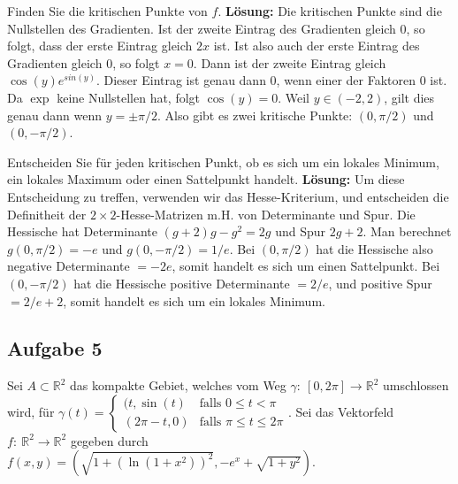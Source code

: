 \documentclass[a4paper,10pt]{article}
\def\R{\mathbb{R}}
\begin{document}
Finden Sie die kritischen Punkte von \( f \).
\textbf{Lösung:} Die kritischen Punkte sind die Nullstellen des Gradienten. Ist der zweite Eintrag des Gradienten gleich \( 0 \), so folgt, dass der erste Eintrag gleich \( 2x \) ist. Ist also auch der erste Eintrag des Gradienten gleich \( 0 \), so folgt \( x = 0\). Dann ist der zweite Eintrag gleich \( \cos(y) e^{sin(y)} \). Dieser Eintrag ist genau dann \( 0 \), wenn einer der Faktoren \( 0 \) ist. Da \( \exp \) keine Nullstellen hat, folgt \( \cos(y) = 0 \). Weil \( y \in (-2, 2) \), gilt dies genau dann wenn \( y = \pm \pi/2 \). Also gibt es zwei kritische Punkte: \( (0, \pi/2) \) und \( (0, -\pi/2) \).

Entscheiden Sie für jeden kritischen Punkt, ob es sich um ein lokales Minimum, ein lokales Maximum oder einen Sattelpunkt handelt.
\textbf{Lösung:} Um diese Entscheidung zu treffen, verwenden wir das Hesse-Kriterium, und entscheiden die Definitheit der \( 2 \times 2\)-Hesse-Matrizen m.H. von Determinante und Spur. Die Hessische hat Determinante \( (g + 2)g - g^2 = 2g \) und Spur \( 2g + 2 \). Man berechnet \( g(0, \pi/2) = -e \) und \( g(0, -\pi/2) = 1/e \). Bei \( (0, \pi/2) \) hat die Hessische also negative Determinante \( = -2e \), somit handelt es sich um einen Sattelpunkt. Bei \( (0, -\pi/2) \) hat die Hessische positive Determinante \( = 2/e \), und positive Spur \( = 2/e + 2 \), somit handelt es sich um ein lokales Minimum.


\subsection{Aufgabe 5}

Sei \( A \subset \R^2 \) das kompakte Gebiet, welches vom Weg \( \gamma: \: [0, 2\pi] \to \R^2 \) umschlossen wird, für
\(
    \gamma(t) = \begin{cases}
        (t, \sin(t) & \text{falls } 0 \leq t < \pi \\
        (2\pi - t, 0) & \text{falls } \pi \leq t \leq 2\pi
    \end{cases} \text{.}
\)
Sei das Vektorfeld \( f: \: \R^2 \to \R^2 \) gegeben durch
\(
    f(x, y) = \left( \sqrt{1 + (\ln(1 + x^2))^2}, -e^x + \sqrt{1 + y^2} \right) \text{.}
\)
\end{document}
